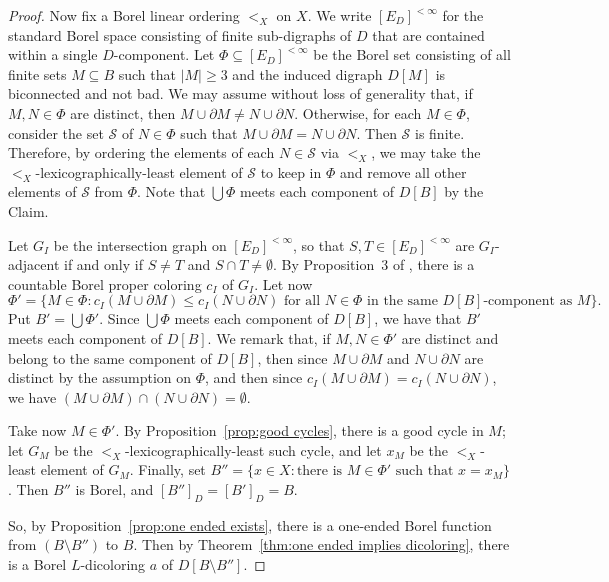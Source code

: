 \documentclass[psamsfonts]{amsart}
\theoremstyle{definition}
\theoremstyle{remark}
\numberwithin{equation}{section}
\begin{document}
\begin{proof}
    Now fix a Borel linear ordering $<_X$ on $X$. We write $[E_D]^{< \infty}$ for the standard Borel space consisting of finite sub-digraphs of $D$ that are contained within a single $D$-component. Let $\Phi \subseteq [E_D]^{< \infty}$ be the Borel set consisting of all finite sets $M \subseteq B$ such that $\vert M \vert \geq 3$ and the induced digraph $D[M]$ is biconnected and not bad. We may assume without loss of generality that, if $M, N \in \Phi$ are distinct, then $M \cup \partial M \neq N \cup \partial N$. Otherwise, for each $M \in \Phi$, consider the set $\mathcal{S}$ of $N \in \Phi$ such that $M \cup \partial M = N \cup \partial N$. Then $\mathcal{S}$ is finite. Therefore, by ordering the elements of each $N \in \mathcal{S}$ via $<_X$, we may take the $<_X$-lexicographically-least element of $\mathcal{S}$ to keep in $\Phi$ and remove all other elements of $\mathcal{S}$ from $\Phi$. Note that $\bigcup \Phi$ meets each component of $D[B]$ by the Claim. 
    
    Let $G_I$ be the intersection graph on $[E_D]^{< \infty}$, so that $S, T \in [E_D]^{<\infty}$ are $G_I$-adjacent if and only if $S \neq T$ and $S \cap T \neq \emptyset$. By Proposition~3 of \cite{cm2016}, there is a countable Borel proper coloring $c_I$ of $G_I$. Let now 
    $$\Phi' = \{M \in \Phi : c_I(M \cup \partial M) \leq c_I(N \cup \partial N) \text{ for all $N \in \Phi$ in the same $D[B]$-component as $M$}\}.$$
    Put $B' = \bigcup \Phi'$. Since $\bigcup \Phi$ meets each component of $D[B]$, we have that $B'$ meets each component of $D[B]$. We remark that, if $M, N \in \Phi'$ are distinct and belong to the same component of $D[B]$, then since $M \cup \partial M$ and $N \cup \partial N$ are distinct by the assumption on $\Phi$, and then since $c_I(M \cup \partial M) = c_I(N \cup \partial N)$, we have $(M \cup \partial M) \cap (N \cup \partial N) = \emptyset$.
    
    Take now $M \in \Phi'$. By Proposition~\ref{prop:good cycles}, there is a good cycle in $M$; let $G_M$ be the $<_X$-lexicographically-least such cycle, and let $x_M$ be the $<_X$-least element of $G_M$. Finally, set $B'' = \{x \in X : \text{there is $M \in \Phi'$ such that } x = x_M \}$. Then $B''$ is Borel, and $[B'']_{D} = [B']_{D} = B$.

    So, by Proposition~\ref{prop:one ended exists}, there is a one-ended Borel function from $(B \setminus B'')$ to $B$. Then by Theorem~\ref{thm:one ended implies dicoloring}, there is a Borel $L$-dicoloring $a$ of $D[B \setminus B'']$. 
    

\end{proof}
\end{document}
